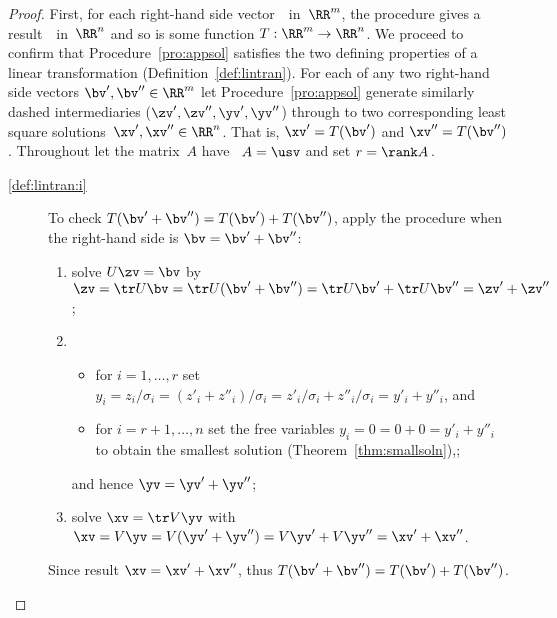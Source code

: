 \begin{proof} 
First, for each right-hand side vector~\bv\ in~\(\RR^m\), the procedure gives a result~\xv\ in~\(\RR^n\) and so is some function \(T:\RR^m\to\RR^n\).
We proceed to confirm that Procedure~\ref{pro:appsol} satisfies the two defining properties of a linear transformation (Definition~\ref{def:lintran}).
For each of any two right-hand side vectors \(\bv',\bv''\in\RR^m\) let Procedure~\ref{pro:appsol} generate similarly dashed intermediaries (\(\zv',\zv'',\yv',\yv''\)) through to two corresponding least square solutions~\(\xv',\xv''\in\RR^n\).
That is, \(\xv'=T(\bv')\) and \(\xv''=T(\bv'')\).
Throughout let the matrix~\(A\) have \svd\ \(A=\usv\) and set \(r=\rank A\)\,.
\begin{description}
\item[\ref{def:lintran:i}]  
To check \(T(\bv'+\bv'')=T(\bv')+T(\bv'')\), apply the procedure when the right-hand side is \(\bv=\bv'+\bv''\):
\begin{enumerate}
\item solve \(U\zv=\bv\) by \(\zv=\tr U\bv=\tr U(\bv'+\bv'')=\tr U\bv'+\tr U\bv''=\zv'+\zv''\);
\item \begin{itemize}
\item for \(i=1,\ldots,r\) set \(y_i=z_i/\sigma_i=(z'_i+z''_i)/\sigma_i=z'_i/\sigma_i+z''_i/\sigma_i=y'_i+y''_i\), and
\item for \(i=r+1,\ldots,n\) set the free variables \(y_i=0=0+0=y'_i+y''_i\) to obtain the smallest solution (Theorem~\ref{thm:smallsoln}),;
\end{itemize}
and hence \(\yv=\yv'+\yv''\);
\item solve \(\xv=\tr V\yv\) with \(\xv=V\yv=V(\yv'+\yv'')=V\yv'+V\yv''=\xv'+\xv''\).
\end{enumerate}
Since result \(\xv=\xv'+\xv''\), thus \(T(\bv'+\bv'')=T(\bv')+T(\bv'')\).


\end{description}
\end{proof}
